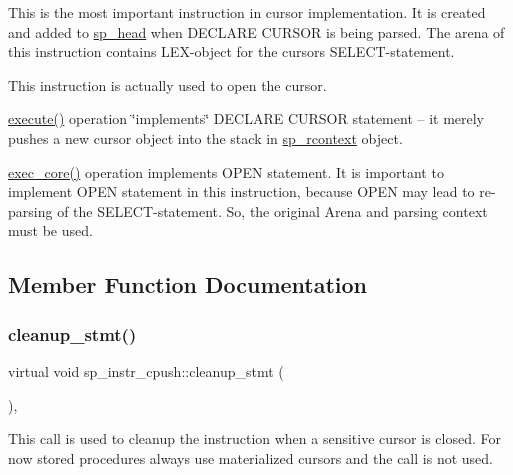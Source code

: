 This is the most important instruction in cursor implementation. It is created and added to \mbox{\hyperlink{classsp__head}{sp\+\_\+head}} when D\+E\+C\+L\+A\+RE C\+U\+R\+S\+OR is being parsed. The arena of this instruction contains L\+EX-\/object for the cursor\textquotesingle{}s S\+E\+L\+E\+CT-\/statement.

This instruction is actually used to open the cursor.

\mbox{\hyperlink{classsp__instr__cpush_a7d372bf13da26255682db5ea8da893b0}{execute()}} operation \char`\"{}implements\char`\"{} D\+E\+C\+L\+A\+RE C\+U\+R\+S\+OR statement -- it merely pushes a new cursor object into the stack in \mbox{\hyperlink{classsp__rcontext}{sp\+\_\+rcontext}} object.

\mbox{\hyperlink{classsp__instr__cpush_a29936e62ed32e5db6d5a3fdd624fe969}{exec\+\_\+core()}} operation implements O\+P\+EN statement. It is important to implement O\+P\+EN statement in this instruction, because O\+P\+EN may lead to re-\/parsing of the S\+E\+L\+E\+CT-\/statement. So, the original Arena and parsing context must be used. 

\subsection{Member Function Documentation}
\mbox{\label{classsp__instr__cpush_aaf0ea89ac73cfcaff29ac4e3b9c97f7e}} 
\subsubsection{\texorpdfstring{cleanup\+\_\+stmt()}{cleanup\_stmt()}}
{\footnotesize\ttfamily virtual void sp\+\_\+instr\+\_\+cpush\+::cleanup\+\_\+stmt (\begin{DoxyParamCaption}{ }\end{DoxyParamCaption})\hspace{0.3cm}{\ttfamily [inline]}, {\ttfamily [virtual]}}

This call is used to cleanup the instruction when a sensitive cursor is closed. For now stored procedures always use materialized cursors and the call is not used. \mbox{\label{classsp__instr__cpush_a29936e62ed32e5db6d5a3fdd624fe969}} 
